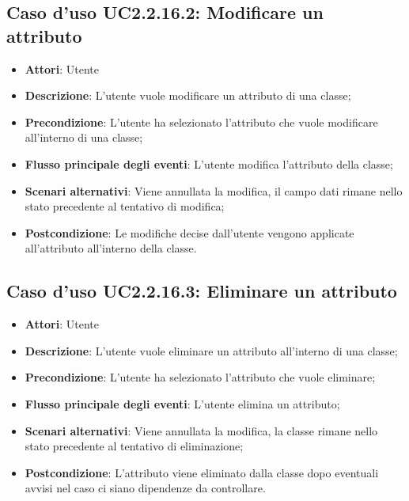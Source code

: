 \documentclass[../AnalisiDeiRequisiti.tex]{subfiles}
\begin{document}
			\subsection{Caso d'uso UC2.2.16.2: Modificare un attributo}
			\begin{itemize}
				\item \textbf{Attori}: Utente
				\item \textbf{Descrizione}: L'utente vuole modificare un attributo di una classe;
				\item \textbf{Precondizione}: L'utente ha selezionato l'attributo che vuole modificare all'interno di una classe;
				\item \textbf{Flusso principale degli eventi}: L'utente modifica l'attributo della classe;
				\item \textbf{Scenari alternativi}: Viene annullata la modifica, il campo dati rimane nello stato precedente al tentativo di modifica;
				\item \textbf{Postcondizione}: Le modifiche decise dall'utente vengono applicate all'attributo all'interno della classe.
			\end{itemize}
			\subsection{Caso d'uso UC2.2.16.3: Eliminare un attributo}
			\begin{itemize}
				\item \textbf{Attori}: Utente
				\item \textbf{Descrizione}: L'utente vuole eliminare un attributo all'interno di una classe;
				\item \textbf{Precondizione}: L'utente ha selezionato l'attributo che vuole eliminare;
				\item \textbf{Flusso principale degli eventi}: L'utente elimina un attributo;
				\item \textbf{Scenari alternativi}: Viene annullata la modifica, la classe rimane nello stato precedente al tentativo di eliminazione;
				\item \textbf{Postcondizione}: L'attributo viene eliminato dalla classe dopo eventuali avvisi nel caso ci siano dipendenze da controllare.
			\end{itemize}
\end{document}
